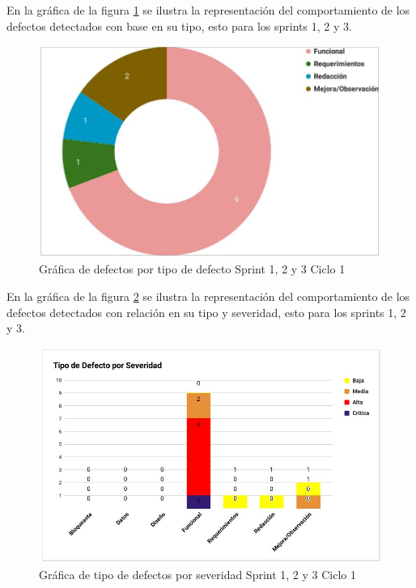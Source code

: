 En la gráfica de la figura \ref{fig:infos1c1-2} se ilustra la representación del comportamiento de los defectos detectados con base en su tipo, esto para los sprints 1, 2 y 3.

\begin{figure}[H]
	\begin{center}
		\includegraphics[width=.65\textwidth]{images/pruebas/s1c1-2}
		\caption{Gráfica de defectos por tipo de defecto Sprint 1, 2 y 3 Ciclo 1}
		\label{fig:infos1c1-2}
	\end{center}
\end{figure}

\newpage

En la gráfica de la figura \ref{fig:infos1c1-3} se ilustra la representación del comportamiento de los defectos detectados con relación en su tipo y severidad, esto para los sprints 1, 2 y 3.

\begin{figure}[H]
	\begin{center}
		\includegraphics[width=.95\textwidth]{images/pruebas/s1c1-3}
		\caption{Gráfica de tipo de defectos por severidad Sprint 1, 2 y 3 Ciclo 1}
		\label{fig:infos1c1-3}
	\end{center}
\end{figure}

